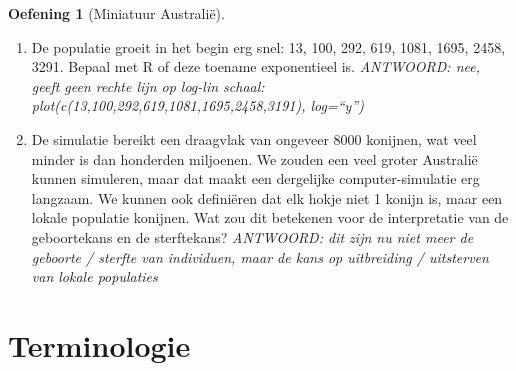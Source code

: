 \documentclass[
  a4paper,
]{scrbook}
\providecommand{\tightlist}{%
  \setlength{\itemsep}{0pt}\setlength{\parskip}{0pt}}\usepackage{longtable,booktabs,array}
\theoremstyle{definition}
\newtheorem{exercise}{Oefening}[chapter]
\theoremstyle{remark}
\begin{document}
\begin{exercise}[Miniatuur
Australië]
\begin{enumerate}
\def\labelenumi{\alph{enumi})}
\setcounter{enumi}{3}
\tightlist
\item
  De populatie groeit in het begin erg snel: 13, 100, 292, 619, 1081,
  1695, 2458, 3291. Bepaal met R of deze toename exponentieel is.
  \emph{ANTWOORD: nee, geeft geen rechte lijn op log-lin schaal:
  plot(c(13,100,292,619,1081,1695,2458,3191), log=``y'')}
\item
  De simulatie bereikt een draagvlak van ongeveer 8000 konijnen, wat
  veel minder is dan honderden miljoenen. We zouden een veel groter
  Australië kunnen simuleren, maar dat maakt een dergelijke
  computer-simulatie erg langzaam. We kunnen ook definiëren dat elk
  hokje niet 1 konijn is, maar een lokale populatie konijnen. Wat zou
  dit betekenen voor de interpretatie van de geboortekans en de
  sterftekans? \emph{ANTWOORD: dit zijn nu niet meer de geboorte /
  sterfte van individuen, maar de kans op uitbreiding / uitsterven van
  lokale populaties}
\end{enumerate}

\end{exercise}

\hypertarget{terminologie-1}{%
\section{Terminologie}\label{terminologie-1}}
\end{document}
